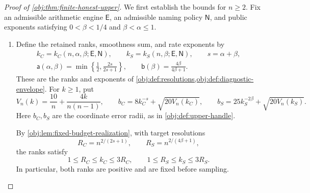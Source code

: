 \begin{proof}[Proof of \cref{obj:thm:finite-honest-upper}]
We first establish the bounds for \(n\ge2\). Fix an admissible arithmetic engine \(\mathsf E\), an admissible naming policy \(\mathsf N\), and public exponents satisfying \(0<\beta<1/4\) and \(\beta<\alpha\le1\).

\begin{enumerate}
\item Define the retained ranks, smoothness sum, and rate exponents by
\[
\begin{gathered}
k_C=k_C(n,\alpha,\beta;\mathsf E,\mathsf N),
\qquad
k_S=k_S(n,\beta;\mathsf E,\mathsf N),
\qquad s=\alpha+\beta,\\
\mathsf a(\alpha,\beta)
=\min\left\{\frac12,\frac{2s}{2s+1}\right\},
\qquad
\mathsf b(\beta)=\frac{4\beta}{4\beta+1}.
\end{gathered}
\]
These are the ranks and exponents of
\cref{obj:def:resolutions,obj:def:diagnostic-envelope}.
For \(k\ge1\), put
\[
V_n(k)=\frac{10}{n}+\frac{4k}{n(n-1)},
\qquad
b_C=8k_C^{-s}+\sqrt{20V_n(k_C)},
\qquad
b_S=25k_S^{-2\beta}+\sqrt{20V_n(k_S)}.
\]
Here \(b_C,b_S\) are the coordinate error radii, as in
\cref{obj:def:upper-handle}.

By \cref{obj:lem:fixed-budget-realization}, with target resolutions
\[
R_C=n^{2/(2s+1)},
\qquad R_S=n^{2/(4\beta+1)},
\]
the ranks satisfy
\[
1\le R_C\le k_C\le3R_C,
\qquad
1\le R_S\le k_S\le3R_S.
\]
In particular, both ranks are positive and are fixed before sampling.


\end{enumerate}
\end{proof}
